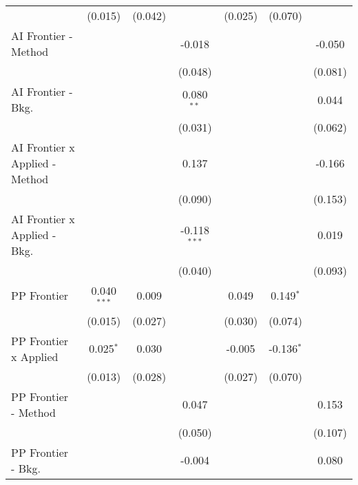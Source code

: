 \begin{tabular}{lcccccc}
                                  & (0.015)       & (0.042)       &                & (0.025)      & (0.070)      &   \\   
   AI Frontier - Method           &               &               & -0.018         &              &              & -0.050\\   
                                  &               &               & (0.048)        &              &              & (0.081)\\   
   AI Frontier - Bkg.             &               &               & 0.080$^{**}$   &              &              & 0.044\\   
                                  &               &               & (0.031)        &              &              & (0.062)\\   
   AI Frontier x Applied - Method &               &               & 0.137          &              &              & -0.166\\   
                                  &               &               & (0.090)        &              &              & (0.153)\\   
   AI Frontier x Applied - Bkg.   &               &               & -0.118$^{***}$ &              &              & 0.019\\   
                                  &               &               & (0.040)        &              &              & (0.093)\\   
   PP Frontier                    & 0.040$^{***}$ & 0.009         &                & 0.049        & 0.149$^{*}$  &   \\   
                                  & (0.015)       & (0.027)       &                & (0.030)      & (0.074)      &   \\   
   PP Frontier x Applied          & 0.025$^{*}$   & 0.030         &                & -0.005       & -0.136$^{*}$ &   \\   
                                  & (0.013)       & (0.028)       &                & (0.027)      & (0.070)      &   \\   
   PP Frontier - Method           &               &               & 0.047          &              &              & 0.153\\   
                                  &               &               & (0.050)        &              &              & (0.107)\\   
   PP Frontier - Bkg.             &               &               & -0.004         &              &              & 0.080\\   

\end{tabular}
